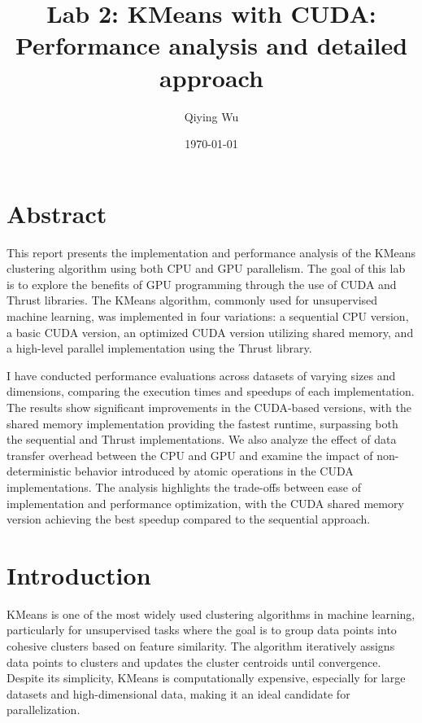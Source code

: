 \documentclass[letterpaper,12pt]{article}
\theoremstyle{remark}
\begin{document}
\title{Lab 2: KMeans with CUDA: \\
\large 
Performance analysis and detailed approach
   }


\date{\today}
\author{Qiying Wu}
\maketitle





\section*{Abstract }

 This report presents the implementation and performance analysis of the KMeans clustering algorithm using both CPU and GPU parallelism. The goal of this lab is to explore the benefits of GPU programming through the use of CUDA and Thrust libraries. The KMeans algorithm, commonly used for unsupervised machine learning, was implemented in four variations: a sequential CPU version, a basic CUDA version, an optimized CUDA version utilizing shared memory, and a high-level parallel implementation using the Thrust library.

I have conducted performance evaluations across datasets of varying sizes and dimensions, comparing the execution times and speedups of each implementation. The results show significant improvements in the CUDA-based versions, with the shared memory implementation providing the fastest runtime, surpassing both the sequential and Thrust implementations. We also analyze the effect of data transfer overhead between the CPU and GPU and examine the impact of non-deterministic behavior introduced by atomic operations in the CUDA implementations. The analysis highlights the trade-offs between ease of implementation and performance optimization, with the CUDA shared memory version achieving the best speedup compared to the sequential approach. 


\section*{Introduction }
KMeans is one of the most widely used clustering algorithms in machine learning, particularly for unsupervised tasks where the goal is to group data points into cohesive clusters based on feature similarity. The algorithm iteratively assigns data points to clusters and updates the cluster centroids until convergence. Despite its simplicity, KMeans is computationally expensive, especially for large datasets and high-dimensional data, making it an ideal candidate for parallelization.
\end{document}
